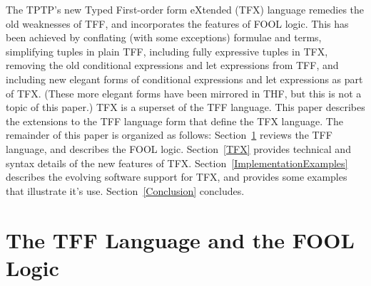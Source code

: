 \documentclass{easychair}
\begin{document}
The TPTP's new Typed First-order form eXtended (TFX) language remedies the
old weaknesses of TFF, and incorporates the features of FOOL logic.
This has been achieved by conflating (with some exceptions) formulae and 
terms, simplifying tuples in plain TFF, including fully expressive tuples in 
TFX, removing the old conditional expressions and let expressions from 
TFF, and including new elegant forms of conditional expressions and let 
expressions as part of TFX. 
(These more elegant forms have been mirrored in THF, but this is not a topic of
this paper.)
TFX is a superset of the TFF language. 
This paper describes the extensions to the TFF language form that define the 
TFX language.
The remainder of this paper is organized as follows:
Section~\ref{TPTPFOOL} reviews the TFF language, and describes the FOOL logic.
Section~\ref{TFX} provides technical and syntax details of the new features 
of TFX.
Section~\ref{ImplementationExamples} describes the evolving software 
support for TFX, and provides some examples that illustrate it's use.
Section~\ref{Conclusion} concludes.

\section{The TFF Language and the FOOL Logic}
\label{TPTPFOOL}
\end{document}
